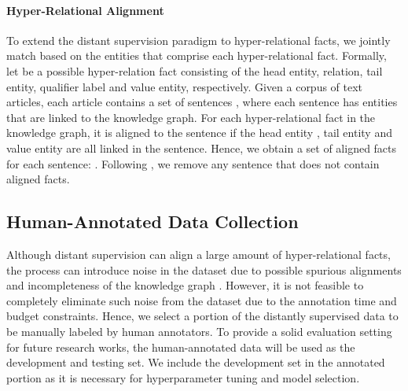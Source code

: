 \documentclass[11pt]{article}
\begin{document}
\paragraph{Hyper-Relational Alignment}
To extend the distant supervision paradigm to hyper-relational facts, we jointly match based on the entities that comprise each hyper-relational fact.
Formally, let  be a possible hyper-relation fact consisting of the head entity, relation, tail entity, qualifier label and value entity, respectively.
Given a corpus of text articles, each article contains a set of sentences , where each sentence  has  entities that are linked to the knowledge graph.
For each hyper-relational fact  in the knowledge graph, it is aligned to the sentence  if the head entity , tail entity  and value entity  are all linked in the sentence.
Hence, we obtain a set of aligned facts for each sentence:  .
Following \citet{10.1007/978-3-642-15939-8_10}, we remove any sentence that does not contain aligned facts.


\subsection{Human-Annotated Data Collection}
\label{sec:human}
Although distant supervision can align a large amount of hyper-relational facts, the process can introduce noise in the dataset due to possible spurious alignments and incompleteness of the knowledge graph \citep{7358050}.
However, it is not feasible to completely eliminate such noise from the dataset due to the annotation time and budget constraints.
Hence, we select a portion of the distantly supervised data to be manually labeled by human annotators.
To provide a solid evaluation setting for future research works, the human-annotated data will be used as the development and testing set.
We include the development set in the annotated portion as it is necessary for hyperparameter tuning and model selection.
\end{document}
